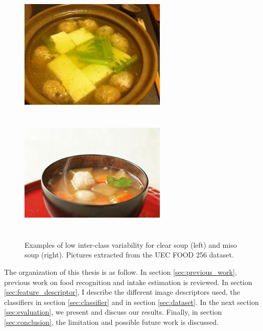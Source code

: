 \begin{figure}
    \centering
    \includegraphics[width=7cm, height=6cm]{img/clear_soup.jpg}
    \includegraphics[width=7cm, height=6cm]{img/miso_soup.jpg}
    \caption[Examples of low inter-class variability for kaya toast]{Examples of low inter-class variability for clear soup (left) and miso soup (right). Pictures extracted from the UEC FOOD 256 dataset.}
    \label{fig:inter-class_variability}
\end{figure}

The organization of this thesis is as follow. In section \ref{sec:previous_work}, previous work on food recognition and intake estimation is reviewed. In section \ref{sec:feature_descriptor}, I describe the different image descriptors used, the classifiers in section \ref{sec:classifier} and in section \ref{sec:dataset}. In the next section \ref{sec:evaluation}, we present and discuss our results. Finally, in section \ref{sec:conclusion}, the limitation and possible future work is discussed.
